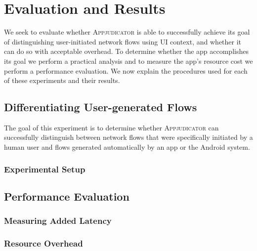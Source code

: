 \section{Evaluation and Results}
\label{sec:evaluation-and-results}

We seek to evaluate whether \textsc{Appjudicator} is able to successfully
achieve its goal of distinguishing user-initiated network flows using UI
context, and whether it can do so with acceptable overhead. To determine whether
the app accomplishes its goal we perform a practical analysis and to measure the
app's resource cost we perform a performance evaluation. We now explain the
procedures used for each of these experiments and their results.

\subsection{Differentiating User-generated Flows}
\label{sec:differentiating-user-generated-flows}

The goal of this experiment is to determine whether \textsc{Appjudicator} can
successfully distinguish between network flows that were specifically initiated
by a human user and flows generated automatically by an app or the Android
system.

\subsubsection{Experimental Setup}
\label{sec:experimental-setup}


\subsection{Performance Evaluation}
\label{sec:performance-evaluation}

\subsubsection{Measuring Added Latency}
\label{sec:measuring-added-latency}

\subsubsection{Resource Overhead}
\label{sec:resource-overhead}

\newpage
